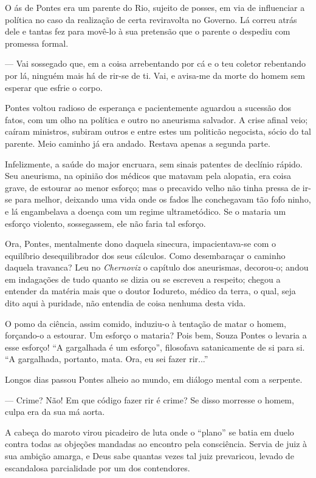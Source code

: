 O ás de Pontes era um parente do Rio, sujeito de posses, em via de
influenciar a política no caso da realização de certa reviravolta no
Governo. Lá correu atrás dele e tantas fez para movê-lo à sua pretensão
que o parente o despediu com promessa formal.

--- Vai sossegado que, em a coisa arrebentando por cá e o teu coletor
rebentando por lá, ninguém mais há de rir-se de ti. Vai, e avisa-me da
morte do homem sem esperar que esfrie o corpo.

Pontes voltou radioso de esperança e pacientemente aguardou a sucessão
dos fatos, com um olho na política e outro no aneurisma salvador. A
crise afinal veio; caíram ministros, subiram outros e entre estes um
politicão negocista, sócio do tal parente. Meio caminho já era andado.
Restava apenas a segunda parte.

Infelizmente, a saúde do major encruara, sem sinais patentes de declínio
rápido. Seu aneurisma, na opinião dos médicos que matavam pela alopatia,
era coisa grave, de estourar ao menor esforço; mas o precavido velho não
tinha pressa de ir-se para melhor, deixando uma vida onde os fados lhe
conchegavam tão fofo ninho, e lá engambelava a doença com um regime
ultrametódico. Se o mataria um esforço violento, sossegassem, ele não
faria tal esforço.

Ora, Pontes, mentalmente dono daquela sinecura, impacientava-se com o
equilíbrio desequilibrador dos seus cálculos. Como desembaraçar o
caminho daquela travanca? Leu no \emph{Chernoviz} o capítulo dos
aneurismas, decorou-o; andou em indagações de tudo quanto se dizia ou se
escreveu a respeito; chegou a entender da matéria mais que o doutor
Iodureto, médico da terra, o qual, seja dito aqui à puridade, não
entendia de coisa nenhuma desta vida.

O pomo da ciência, assim comido, induziu-o à tentação de matar o homem,
forçando-o a estourar. Um esforço o mataria? Pois bem, Souza Pontes o
levaria a esse esforço! ``A gargalhada é um esforço'', filosofava
satanicamente de si para si. ``A gargalhada, portanto, mata. Ora, eu sei
fazer rir...''

Longos dias passou Pontes alheio ao mundo, em diálogo mental com a
serpente.

--- Crime? Não! Em que código fazer rir é crime? Se disso morresse o
homem, culpa era da sua má aorta.

A cabeça do maroto virou picadeiro de luta onde o ``plano'' se batia em
duelo contra todas as objeções mandadas ao encontro pela consciência.
Servia de juiz à sua ambição amarga, e Deus sabe quantas vezes tal juiz
prevaricou, levado de escandalosa parcialidade por um dos contendores.

